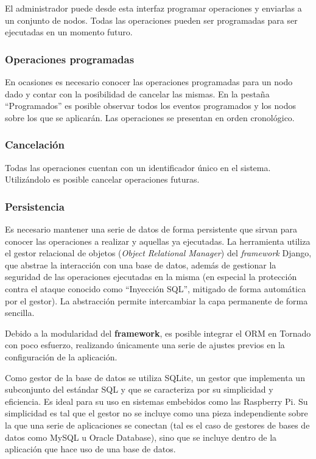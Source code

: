 \documentclass{article}
\begin{document}
El administrador puede desde esta interfaz programar operaciones y enviarlas a un conjunto de nodos. Todas las operaciones pueden ser programadas para ser ejecutadas en un momento futuro.

\subsubsection{Operaciones programadas}

En ocasiones es necesario conocer las operaciones programadas para un nodo dado y contar con la posibilidad de cancelar las mismas. En la pestaña ``Programados'' es posible observar todos los eventos programados y los nodos sobre los que se aplicarán. Las operaciones se presentan en orden cronológico.
\subsubsection{Cancelación}

Todas las operaciones cuentan con un identificador único en el sistema. Utilizándolo es posible cancelar operaciones futuras.

\subsubsection{Persistencia}

Es necesario mantener una serie de datos de forma persistente que sirvan para conocer las operaciones a realizar y aquellas ya ejecutadas. La herramienta utiliza el gestor relacional de objetos (\textit{Object Relational Manager}) del \textit{framework} Django, que abstrae la interacción con una base de datos, además de gestionar la seguridad de las operaciones ejecutadas en la misma (en especial la protección contra el ataque conocido como ``Inyección SQL'', mitigado de forma automática por el gestor). La abstracción permite intercambiar la capa permanente de forma sencilla.

Debido a la modularidad del \textbf{framework}, es posible integrar el ORM en Tornado con poco esfuerzo, realizando únicamente una serie de ajustes previos en la configuración de la aplicación.

Como gestor de la base de datos se utiliza SQLite, un gestor que implementa un subconjunto del estándar SQL y que se caracteriza por su simplicidad y eficiencia. Es ideal para su uso en sistemas embebidos como las Raspberry Pi. Su simplicidad es tal que el gestor no se incluye como una pieza independiente sobre la que una serie de aplicaciones se conectan (tal es el caso de gestores de bases de datos como MySQL u Oracle Database), sino que se incluye dentro de la aplicación que hace uso de una base de datos.
\end{document}
